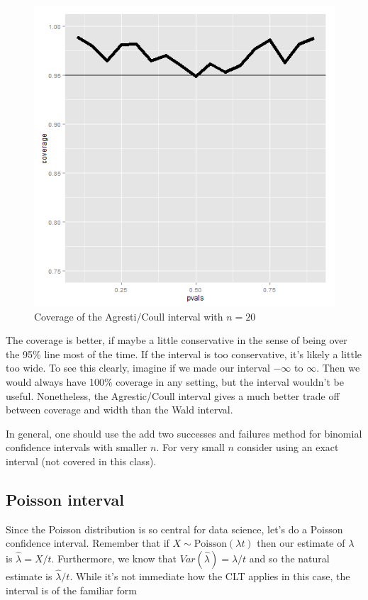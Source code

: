 \documentclass[]{article}
\begin{document}
\begin{figure}[htbp]
\centering
\includegraphics{LeanPub/images/agrestiCoull-1.png}
\caption{Coverage of the Agresti/Coull interval with $n=20$}
\end{figure}

The coverage is better, if maybe a little conservative in the sense of
being over the 95\% line most of the time. If the interval is too
conservative, it's likely a little too wide. To see this clearly,
imagine if we made our interval $-\infty$ to $\infty$. Then we would
always have 100\% coverage in any setting, but the interval wouldn't be
useful. Nonetheless, the Agrestic/Coull interval gives a much better
trade off between coverage and width than the Wald interval.

In general, one should use the add two successes and failures method for
binomial confidence intervals with smaller $n$. For very small $n$
consider using an exact interval (not covered in this class).

\subsection{Poisson interval}\label{poisson-interval}

Since the Poisson distribution is so central for data science, let's do
a Poisson confidence interval. Remember that if
$X \sim \mbox{Poisson}(\lambda t)$ then our estimate of $\lambda$ is
$\hat \lambda = X/t$. Furthermore, we know that
$Var(\hat \lambda) = \lambda / t$ and so the natural estimate is
$\hat \lambda / t$. While it's not immediate how the CLT applies in this
case, the interval is of the familiar form
\end{document}
